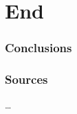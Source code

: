 \documentclass[aspectratio=169,x11names]{beamer}
\begin{document}
\section{End}
{
    
    \begin{frame}
	\frametitle{Conclusions}
	\end{frame}
    
    \begin{frame}[fragile]
    \frametitle{Sources}
    \dots
    \vfill
    \end{frame}
}
\end{document}
